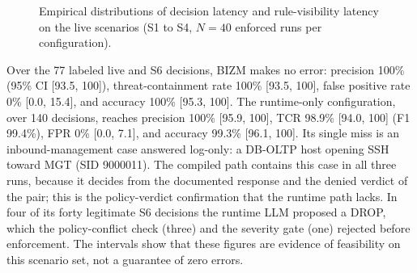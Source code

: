 \documentclass[final,5p]{elsarticle}
\begin{document}
\begin{figure}[t]
    \caption{Empirical distributions of decision latency and rule-visibility latency on the live scenarios (S1 to S4, $N=40$ enforced runs per configuration).}
    \label{fig:latency_cdf}
\end{figure}

Over the 77 labeled live and S6 decisions, BIZM makes no error: precision 100\% (95\% CI [93.5, 100]), threat-containment rate 100\% [93.5, 100], false positive rate 0\% [0.0, 15.4], and accuracy 100\% [95.3, 100]. The runtime-only configuration, over 140 decisions, reaches precision 100\% [95.9, 100], TCR 98.9\% [94.0, 100] (F1 99.4\%), FPR 0\% [0.0, 7.1], and accuracy 99.3\% [96.1, 100]. Its single miss is an inbound-management case answered log-only: a DB-OLTP host opening SSH toward MGT (SID 9000011). The compiled path contains this case in all three runs, because it decides from the documented response and the denied verdict of the pair; this is the policy-verdict confirmation that the runtime path lacks. In four of its forty legitimate S6 decisions the runtime LLM proposed a DROP, which the policy-conflict check (three) and the severity gate (one) rejected before enforcement. The intervals show that these figures are evidence of feasibility on this scenario set, not a guarantee of zero errors.
\end{document}

